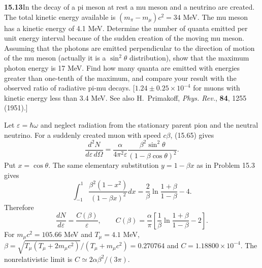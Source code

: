 \par\bigskip
\noindent\textbf{15.13}\quad In the decay of a pi meson at rest a mu meson and a neutrino are created. The total kinetic energy available is $(m_{\pi}-m_{\mu})c^{2}=34$ MeV. The mu meson has a kinetic energy of 4.1 MeV. Determine the number of quanta emitted per unit energy interval because of the sudden creation of the moving mu meson. Assuming that the photons are emitted perpendicular to the direction of motion of the mu meson (actually it is a $\sin^{2}\theta$ distribution), show that the maximum photon energy is 17 MeV. Find how many quanta are emitted with energies greater than one-tenth of the maximum, and compare your result with the observed ratio of radiative pi-mu decays. [$1.24\pm0.25\times10^{-4}$ for muons with kinetic energy less than 3.4 MeV. See also H.~Primakoff, \emph{Phys. Rev.}, \textbf{84}, 1255 (1951).]
\solution

Let $\varepsilon=\hbar\omega$ and neglect radiation from the
stationary parent pion and the neutral neutrino.  For a suddenly
created muon with speed $c\beta$, (15.65) gives
\[
\frac{d^2N}{d\varepsilon\,d\Omega}
=\frac{\alpha}{4\pi^2\varepsilon}
 \frac{\beta^2\sin^2\theta}{(1-\beta\cos\theta)^2}.
\]
Put $x=\cos\theta$.  The same elementary substitution
$y=1-\beta x$ as in Problem 15.3 gives
\[
\int_{-1}^{1}\frac{\beta^2(1-x^2)}{(1-\beta x)^2}dx
=\frac2\beta\ln\frac{1+\beta}{1-\beta}-4.
\]
Therefore
\[
\boxed{\frac{dN}{d\varepsilon}=\frac{C(\beta)}\varepsilon,
\qquad C(\beta)=\frac{\alpha}{\pi}
\left[\frac1\beta\ln\frac{1+\beta}{1-\beta}-2\right].}
\]
For $m_\mu c^2=105.66$ MeV and $T_\mu=4.1$ MeV,
$\beta=\sqrt{T_\mu(T_\mu+2m_\mu c^2)}/(T_\mu+m_\mu c^2)
=0.270764$ and $C=1.18800\times10^{-4}$.
The nonrelativistic limit is $C\simeq2\alpha\beta^2/(3\pi)$.

